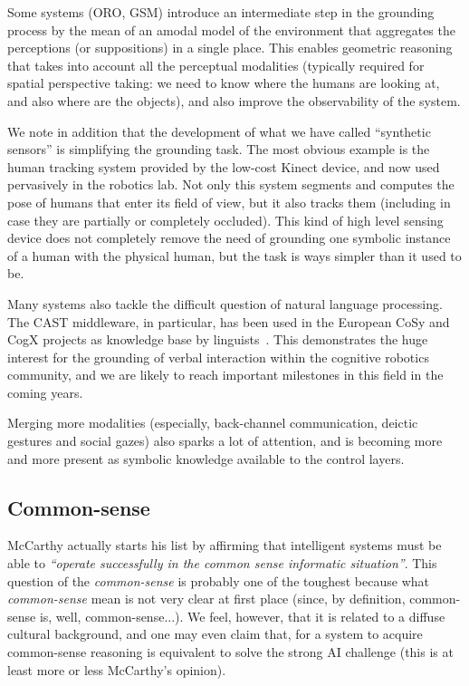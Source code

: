 Some systems (ORO, GSM) introduce an intermediate step in the grounding process
by the mean of an amodal model of the environment that aggregates the
perceptions (or suppositions) in a single place. This enables geometric
reasoning that takes into account all the perceptual modalities (typically
required for spatial perspective taking: we need to know where the humans are
looking at, and also where are the objects), and also improve the observability
of the system.

We note in addition that the development of what we have called ``synthetic
sensors'' is simplifying the grounding task. The most obvious example is the
human tracking system provided by the low-cost Kinect device, and now used
pervasively in the robotics lab. Not only this system segments and computes the
pose of humans that enter its field of view, but it also tracks them (including
in case they are partially or completely occluded). This kind of high level
sensing device does not completely remove the need of grounding one symbolic
instance of a human with the physical human, but the task is ways simpler than
it used to be.

Many systems also tackle the difficult question of natural language processing.
The CAST middleware, in particular, has been used in the European CoSy and CogX
projects as knowledge base by linguists~\cite{Kruijff2010a}. This demonstrates
the huge interest for the grounding of verbal interaction within the cognitive
robotics community, and we are likely to reach important milestones in this
field in the coming years.

Merging more modalities (especially, back-channel communication, deictic
gestures and social gazes) also sparks a lot of attention, and is becoming more
and more present as symbolic knowledge available to the control layers.

\subsection{Common-sense}

McCarthy actually starts his list by affirming that intelligent systems must be
able to \emph{``operate successfully in the common sense informatic
situation''}. This question of the \emph{common-sense} is probably one of the
toughest because what \emph{common-sense} mean is not very clear at first place
(since, by definition, common-sense is, well, common-sense...). We feel,
however, that it is related to a diffuse cultural background, and one may even
claim that, for a system to acquire common-sense reasoning is equivalent to
solve the strong AI challenge (this is at least more or less McCarthy's opinion).

